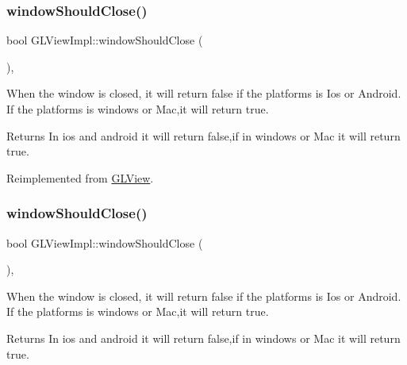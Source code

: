 \subsubsection{\texorpdfstring{window\+Should\+Close()}{windowShouldClose()}\hspace{0.1cm}{\footnotesize\ttfamily [1/2]}}
{\footnotesize\ttfamily bool G\+L\+View\+Impl\+::window\+Should\+Close (\begin{DoxyParamCaption}{ }\end{DoxyParamCaption})\hspace{0.3cm}{\ttfamily [override]}, {\ttfamily [virtual]}}

When the window is closed, it will return false if the platforms is Ios or Android. If the platforms is windows or Mac,it will return true.

\begin{DoxyReturn}{Returns}
In ios and android it will return false,if in windows or Mac it will return true. 
\end{DoxyReturn}


Reimplemented from \hyperlink{classGLView_aa7a837484fd21d7c0a394e996963e84f}{G\+L\+View}.

\mbox{\label{classGLViewImpl_a0d0a12b4bfa3656c9b24ca8b141f7b1e}} 
\subsubsection{\texorpdfstring{window\+Should\+Close()}{windowShouldClose()}\hspace{0.1cm}{\footnotesize\ttfamily [2/2]}}
{\footnotesize\ttfamily bool G\+L\+View\+Impl\+::window\+Should\+Close (\begin{DoxyParamCaption}{ }\end{DoxyParamCaption})\hspace{0.3cm}{\ttfamily [override]}, {\ttfamily [virtual]}}

When the window is closed, it will return false if the platforms is Ios or Android. If the platforms is windows or Mac,it will return true.

\begin{DoxyReturn}{Returns}
In ios and android it will return false,if in windows or Mac it will return true. 
\end{DoxyReturn}


